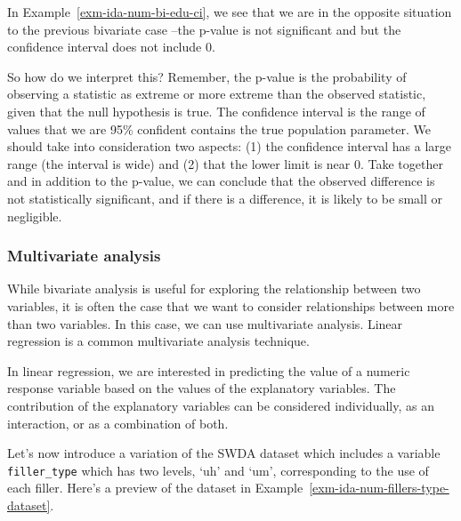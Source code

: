 \documentclass[
  letterpaper,
]{latex/krantz}
\theoremstyle{definition}
\theoremstyle{remark}
\begin{document}
In Example~\ref{exm-ida-num-bi-edu-ci}, we see that we are in the
opposite situation to the previous bivariate case --the p-value is not
significant and but the confidence interval does not include 0.

So how do we interpret this? Remember, the p-value is the probability of
observing a statistic as extreme or more extreme than the observed
statistic, given that the null hypothesis is true. The confidence
interval is the range of values that we are 95\% confident contains the
true population parameter. We should take into consideration two
aspects: (1) the confidence interval has a large range (the interval is
wide) and (2) that the lower limit is near 0. Take together and in
addition to the p-value, we can conclude that the observed difference is
not statistically significant, and if there is a difference, it is
likely to be small or negligible.

\subsubsection{Multivariate analysis}\label{multivariate-analysis-1}

While bivariate analysis is useful for exploring the relationship
between two variables, it is often the case that we want to consider
relationships between more than two variables. In this case, we can use
multivariate analysis. Linear regression is a common multivariate
analysis technique.

In linear regression, we are interested in predicting the value of a
numeric response variable based on the values of the explanatory
variables. The contribution of the explanatory variables can be
considered individually, as an interaction, or as a combination of both.

Let's now introduce a variation of the SWDA dataset which includes a
variable \texttt{filler\_type} which has two levels, `uh' and `um',
corresponding to the use of each filler. Here's a preview of the dataset
in Example~\ref{exm-ida-num-fillers-type-dataset}.
\end{document}
